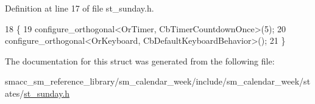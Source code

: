 Definition at line 17 of file st\+\_\+sunday.\+h.


\begin{DoxyCode}
18     \{
19         configure\_orthogonal<OrTimer,  CbTimerCountdownOnce>(5);   
20         configure\_orthogonal<OrKeyboard, CbDefaultKeyboardBehavior>();
21     \}
\end{DoxyCode}


The documentation for this struct was generated from the following file\+:\begin{DoxyCompactItemize}
\item 
smacc\+\_\+sm\+\_\+reference\+\_\+library/sm\+\_\+calendar\+\_\+week/include/sm\+\_\+calendar\+\_\+week/states/\hyperlink{st__sunday_8h}{st\+\_\+sunday.\+h}\end{DoxyCompactItemize}
